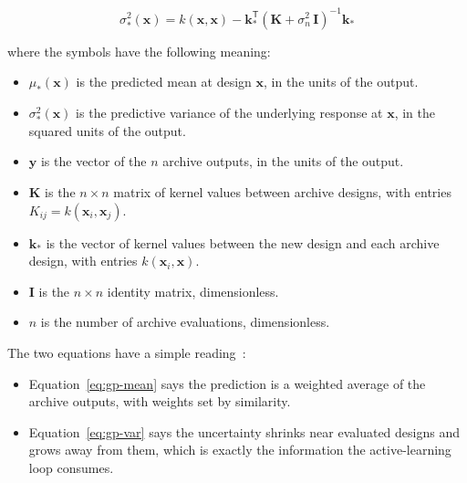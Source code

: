 \begin{equation}
\sigma_*^{2}(\mathbf{x})
= k(\mathbf{x}, \mathbf{x})
- \mathbf{k}_*^{\mathsf T}
\left( \mathbf{K} + \sigma_n^{2}\,\mathbf{I} \right)^{-1} \mathbf{k}_*
\label{eq:gp-var}
\end{equation}

\noindent where the symbols have the following meaning:

\begin{itemize}
  \item $\mu_*(\mathbf{x})$ is the predicted mean at design
        $\mathbf{x}$, in the units of the output.

  \item $\sigma_*^{2}(\mathbf{x})$ is the predictive variance of the
        underlying response at $\mathbf{x}$, in the squared units of
        the output.

  \item $\mathbf{y}$ is the vector of the $n$ archive outputs, in the
        units of the output.

  \item $\mathbf{K}$ is the $n \times n$ matrix of kernel values
        between archive designs, with entries
        $K_{ij} = k(\mathbf{x}_i, \mathbf{x}_j)$.

  \item $\mathbf{k}_*$ is the vector of kernel values between the new
        design and each archive design, with entries
        $k(\mathbf{x}_i, \mathbf{x})$.

  \item $\mathbf{I}$ is the $n \times n$ identity matrix,
        dimensionless.

  \item $n$ is the number of archive evaluations, dimensionless.
\end{itemize}

The two equations have a simple reading~\cite{rasmussen_gp_2006}:

\begin{itemize}
  \item Equation~\eqref{eq:gp-mean} says the prediction is a weighted
        average of the archive outputs, with weights set by similarity.

  \item Equation~\eqref{eq:gp-var} says the uncertainty shrinks near
        evaluated designs and grows away from them, which is exactly the
        information the active-learning loop consumes.
\end{itemize}

